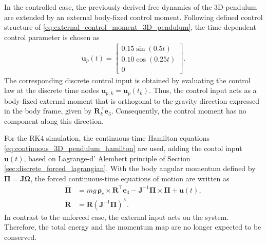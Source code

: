 In the controlled case, the previously derived free dynamics of the 3D-pendulum
are extended by an external body-fixed control moment. Following defined control
structure of \eqref{eq:external_control_moment_3D_pendulum}, the time-dependent control parameter is chosen as
\begin{align}
    \label{eq:controlled_3d_pendulum_input_parameter}
    \bm{u}_p(t)
    =
    \begin{bmatrix}
        0.15\sin(0.5t) \\
        0.10\cos(0.25t) \\
        0
    \end{bmatrix}.
\end{align}
The corresponding discrete control input is obtained by evaluating the control law
at the discrete time nodes $\bm{u}_{p,k} =\bm{u}_p(t_k)$. Thus, the control input acts as a body-fixed external moment that is orthogonal to
the gravity direction expressed in the body frame, given by
$\bm{R}_k^{\top}\bm{e}_3$. Consequently, the control moment has no component
along this direction.

For the RK4 simulation, the continuous-time Hamilton equations \eqref{eq:continuous_3D_pendulum_hamilton} are used, 
adding the contol input $\bm{u}(t)$, based on Lagrange-d' Alembert principle of Section \ref{sec:discrete_forced_lagrangian}.
With the body angular momentum defined by $\bm{\Pi} = \bm{J}\bm{\Omega}$,
the forced continuous-time equations of motion are written as
\begin{subequations}
\label{eq:controlled_3d_pendulum_continuous_RK4}
\begin{align}
    \dot{\bm{\Pi}}
    &=
    mg\,\bm{\rho}_c
    \times
    \bm{R}^{\top}\bm{e}_3
    -
    \bm{J}^{-1}\bm{\Pi}
    \times
    \bm{\Pi}
    +
    \bm{u}(t),
    \label{eq:controlled_3d_pendulum_continuous_momentum}
    \\
    \dot{\bm{R}}
    &=
    \bm{R}
    \left(
        \bm{J}^{-1}\bm{\Pi}
    \right)^{\wedge}.
    \label{eq:controlled_3d_pendulum_continuous_kinematics}
\end{align}
\end{subequations}
In contrast to the unforced case, the external input acts on the system.
Therefore, the total energy and the momentum map are no longer expected to be
conserved.

